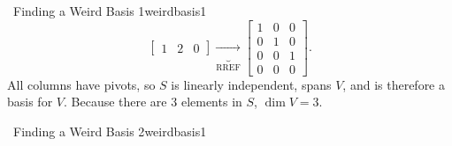 \begin{example}{\Difficulty\,\Difficulty\,\,Finding a Weird Basis 1}{weirdbasis1}
\begin{equation*}
\begin{bmatrix}
                    1 & 2 & 0
                \end{bmatrix}\underbrace{\to}_{\text{RREF}}
                \begin{bmatrix}
                    1 & 0 & 0 \\
                    0 & 1 & 0 \\
                    0 & 0 & 1 \\
                    0 & 0 & 0
                \end{bmatrix}.
            \end{equation*}
            All columns have pivots, so \(S\) is linearly independent, spans \(V\), and is therefore a basis for \(V\). Because there are \(3\) elements in \(S\), \(\dim V=3\).
        \end{example}
        \pagebreak
        \begin{example}{\Difficulty\,\Difficulty\,\,Finding a Weird Basis 2}{weirdbasis1}
            

\end{example}
